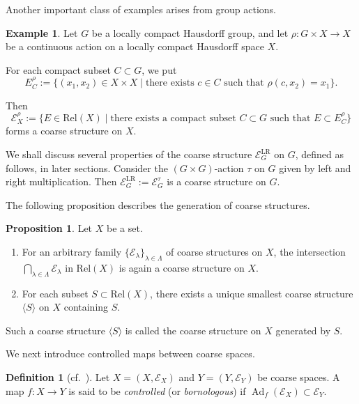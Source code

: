 \documentclass[12pt, a4paper]{amsart}
\theoremstyle{definition}
\newtheorem{proposition}[theorem]{Proposition}
\newtheorem{definition}[theorem]{Definition}
\newtheorem{example}[theorem]{Example}
\newcommand{\Ad}{\mathop{\mathrm{Ad}}\nolimits}
\newcommand{\Rel}{\mathrm{Rel}}
\begin{document}
Another important class of examples arises from group actions.

\begin{example}\label{example:groupaction_coarse}
Let $G$ be a locally compact Hausdorff group, and let 
$\rho:G\times X\to X$ 
be a continuous action on a locally compact Hausdorff space $X$.

For each compact subset $C\subset G$, we put
\[
E_C^\rho
:=
\{
(x_1,x_2)\in X\times X
\mid
\text{there exists }c\in C
\text{ such that }
\rho(c,x_2)=x_1
\}.
\]

Then
\[
\mathcal{E}_X^\rho
:=
\{
E\in\Rel(X)
\mid
\text{there exists a compact subset }
C\subset G
\text{ such that }
E\subset E_C^\rho
\}
\]
forms a coarse structure on $X$.

We shall discuss several properties of the coarse structure $\mathcal{E}^{\mathrm{LR}}_G$ on $G$, defined as follows, in later sections. Consider the $(G \times G)$-action $\tau$ on $G$ given by left and right multiplication. Then $\mathcal{E}^{\mathrm{LR}}_G := \mathcal{E}^{\tau}_G$ is a coarse structure on $G$.
\end{example}

The following proposition describes the generation of coarse structures.

\begin{proposition}
Let $X$ be a set.
\begin{enumerate}
\item
For an arbitrary family
$\{\mathcal{E}_{\lambda}\}_{\lambda\in\Lambda}$
of coarse structures on $X$, the intersection
$\bigcap_{\lambda\in\Lambda}\mathcal{E}_\lambda$
in $\Rel(X)$ is again a coarse structure on $X$.

\item
For each subset $S\subset\Rel(X)$, there exists a unique smallest coarse
structure $\langle S\rangle$ on $X$ containing $S$.
\end{enumerate}

Such a coarse structure $\langle S\rangle$ is called the coarse structure
on $X$ generated by $S$.
\end{proposition}

We next introduce controlled maps between coarse spaces.

\begin{definition}[cf.~\cite{BunkeEngel2020}]\label{definition:ctrmap}
Let
$X=(X,\mathcal{E}_X)$
and
$Y=(Y,\mathcal{E}_Y)$
be coarse spaces.
A map
$f:X\to Y$
is said to be \emph{controlled} (or \emph{bornologous}) if
$\Ad_f(\mathcal{E}_X)
\subset
\mathcal{E}_Y$.
\end{definition}
\end{document}
